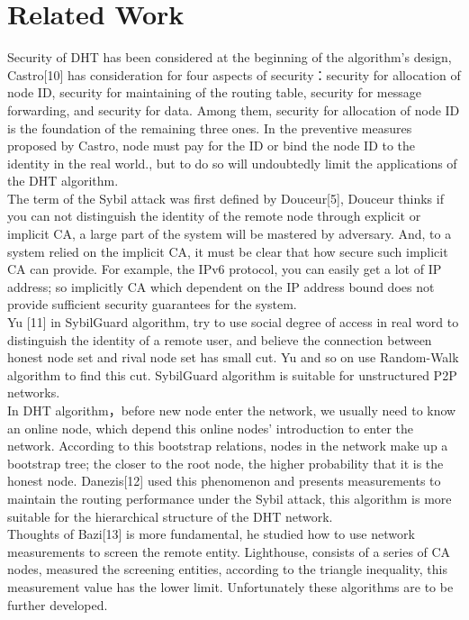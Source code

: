 \documentclass[10pt]{article}
\begin{document}
\section{Related Work}
Security of DHT has been considered at the beginning of the algorithm's design, Castro[10] has consideration for four aspects of security：security for allocation of node ID, security for maintaining of the routing table, security for message forwarding, and security for data. Among them, security for allocation of node ID is the foundation of the remaining three ones. In the preventive measures proposed by Castro, node must pay for the ID or bind the node ID to the identity in the real world., but to do so will undoubtedly limit the applications of the DHT algorithm.\\
The term of the Sybil attack was first defined by Douceur[5], Douceur thinks if you can not distinguish the identity of the remote node through explicit or implicit CA, a large part of the system will be mastered by adversary. And, to a system relied on the implicit CA, it must be clear that how secure such implicit CA can provide. For example, the IPv6 protocol, you can easily get a lot of IP address; so implicitly CA which dependent on the IP address bound does not provide sufficient security guarantees for the system.\\
Yu [11] in  SybilGuard algorithm, try to use social degree of access in real word to distinguish the identity of a remote user, and believe the connection between honest node set and rival node set has small cut. Yu and so on use Random-Walk algorithm to find this cut. SybilGuard algorithm is suitable for unstructured P2P networks.\\
In DHT algorithm，before new node enter the network, we usually need to know an online node, which depend this online nodes' introduction to enter the network. According to this bootstrap relations, nodes in the network make up a bootstrap tree; the closer to the root node, the higher probability that it is the honest node. Danezis[12] used this phenomenon and presents measurements to maintain the routing performance under the Sybil attack, this algorithm is more suitable for the hierarchical structure of the DHT network.\\
Thoughts of Bazi[13] is more fundamental, he studied how to use network measurements to screen the remote entity. Lighthouse, consists of a series of CA nodes, measured the screening entities, according to the triangle inequality, this measurement value has the lower limit. Unfortunately these algorithms are to be further developed.\\
\end{document}
